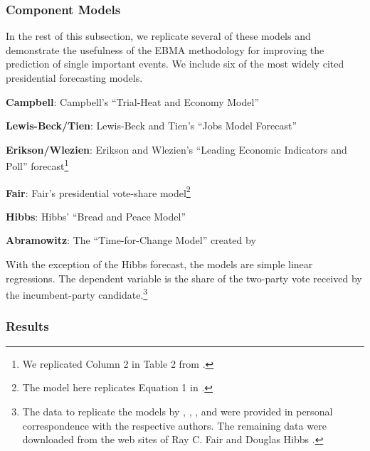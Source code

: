 \documentclass[pdftex,12pt,fullpage,oneside]{amsart}
\begin{document}
\subsubsection{Component Models}

In the rest of this subsection, we replicate several of these models and
demonstrate the usefulness of the EBMA methodology for improving the
prediction of single important events.  We include six of the most widely cited
presidential forecasting models.
\begin{list}{}{\leftmargin=1em}
\item \textbf{Campbell}: Campbell's ``Trial-Heat and Economy Model''
  \citep{Campbell:2008}
\item \textbf{Lewis-Beck/Tien}: Lewis-Beck and Tien's ``Jobs Model Forecast'' \citep{Lewis-Beck:Tien:2008}
\item \textbf{Erikson/Wlezien}: Erikson and Wlezien's ``Leading Economic Indicators
  and Poll'' forecast\footnote{We replicated Column 2 in Table 2 from \citet{Erikson:Wlezien:2008}.}
\item \textbf{Fair}: Fair's presidential vote-share model\footnote{The model here replicates Equation 1 in \citet{Fair:2010}.}
\item \textbf{Hibbs}: Hibbs' ``Bread and Peace Model'' \citep{Hibbs:2000}
\item \textbf{Abramowitz}: The ``Time-for-Change Model'' created by
  \citet{Abramowitz:2008}
\end{list}
\noindent With the exception of the Hibbs forecast, the models are
simple linear regressions. The dependent variable is the share of the
two-party vote received by the incumbent-party candidate.\footnote{The
  data to replicate the models by \citet{Abramowitz:2008},
  \citet{Campbell:2008}, \citet{Erikson:Wlezien:2008}, and
  \citet{Lewis-Beck:Tien:2008} were provided in personal
  correspondence with the respective authors.  The remaining data were
  downloaded from the web sites of Ray C. Fair \nocite{Fair2011} and
  Douglas Hibbs \nocite{Hibbs2011}.}


\subsubsection{Results}
\end{document}
